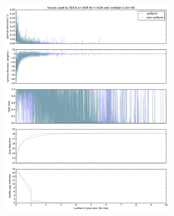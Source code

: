 \documentclass{beamer}
\DeclareMathOperator{\1}{\mathbb{1}}
\begin{document}
\begin{frame}
	\begin{figure}
    \centering
    \begin{subfigure}[t]{0.3\textwidth}
        \centering
        \includegraphics[width=\textwidth]{images/20170914_040249_ocr_annex.pdf}
    \end{subfigure}
    ~
    \begin{subfigure}[t]{0.3\textwidth}
        \centering

\end{subfigure}
\end{figure}
\end{frame}
\end{document}
